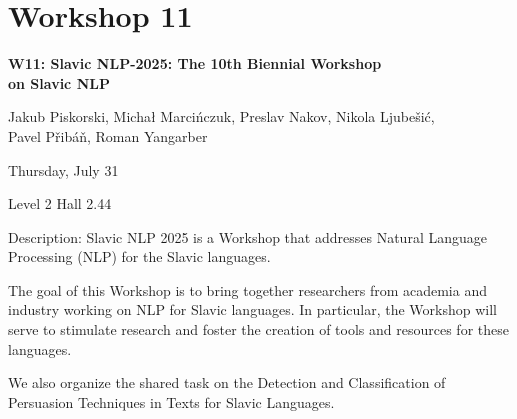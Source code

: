 \clearpage



\section[W11: Slavic NLP-2025: The 10th Biennial Workshop \\
on Slavic NLP]{Workshop 11}
\label{workshop_11}

\begin{center}
    {\Large \textbf{W11: Slavic NLP-2025: The 10th Biennial Workshop \\
    on Slavic NLP}}\\
    
 \vspace{5mm}

   Jakub Piskorski, Michał Marcińczuk, Preslav Nakov, Nikola Ljubešić, \\
   Pavel Přibáň, Roman Yangarber\\

 \vspace{5mm}

    Thursday, July 31
    
   Level 2 Hall 2.44

\end{center}

Description: Slavic NLP 2025 is a Workshop that addresses Natural Language Processing (NLP) for the Slavic languages.

The goal of this Workshop is to bring together researchers from academia and industry working on NLP for Slavic languages. In particular, the Workshop will serve to stimulate research and foster the creation of tools and resources for these languages.

We also organize the shared task on the Detection and Classification of Persuasion Techniques in Texts for Slavic Languages.


